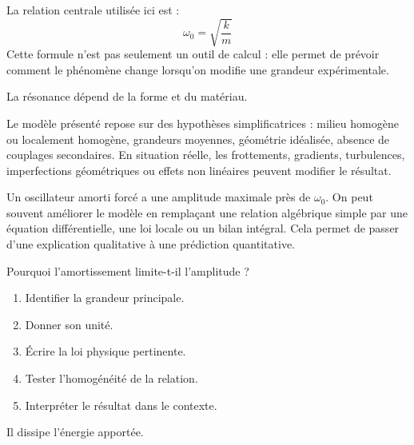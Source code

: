 \documentclass[11pt,a4paper]{article}
\begin{document}
\begin{theorembox}
La relation centrale utilisée ici est :
\[
\omega_0=\sqrt{\frac{k}{m}}
\]
Cette formule n'est pas seulement un outil de calcul : elle permet de prévoir comment le phénomène change lorsqu'on modifie une grandeur expérimentale.
\end{theorembox}

\begin{odgbox}
La résonance dépend de la forme et du matériau.
\end{odgbox}

\begin{attentionbox}
Le modèle présenté repose sur des hypothèses simplificatrices : milieu homogène ou localement homogène, grandeurs moyennes, géométrie idéalisée, absence de couplages secondaires. En situation réelle, les frottements, gradients, turbulences, imperfections géométriques ou effets non linéaires peuvent modifier le résultat.
\end{attentionbox}

\begin{approfondissementbox}
Un oscillateur amorti forcé a une amplitude maximale près de $\omega_0$.
On peut souvent améliorer le modèle en remplaçant une relation algébrique simple par une équation différentielle, une loi locale ou un bilan intégral. Cela permet de passer d'une explication qualitative à une prédiction quantitative.
\end{approfondissementbox}

\begin{exercicebox}
Pourquoi l'amortissement limite-t-il l'amplitude ?
\begin{enumerate}
  \item Identifier la grandeur principale.
  \item Donner son unité.
  \item Écrire la loi physique pertinente.
  \item Tester l'homogénéité de la relation.
  \item Interpréter le résultat dans le contexte.
\end{enumerate}
\end{exercicebox}

\begin{corrigebox}[Indication]
Il dissipe l'énergie apportée.
\end{corrigebox}


\end{document}

